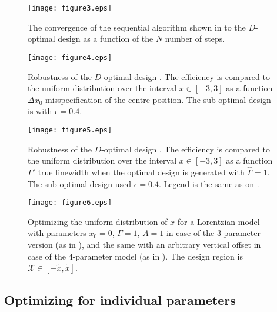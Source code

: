 \documentclass[12pt]{iopart}
\begin{document}
\begin{figure}
\texttt{[image: figure3.eps]}
\caption{The convergence of the sequential algorithm shown in  to the $D$-optimal design  as a function of the $N$ number of steps.}
\label{fig:xinefficiency}
\end{figure}

\begin{figure}
\texttt{[image: figure4.eps]}
\caption{Robustness of the $D$-optimal design . The efficiency is compared to the uniform distribution over the interval $x\in [-3,3]$ as a function $\Delta x_0$ misspecification of the centre position. The sub-optimal design is  with $\epsilon = 0.4$.}
\label{fig:x0robust}
\end{figure}

\begin{figure}
\texttt{[image: figure5.eps]}
\caption{Robustness of the $D$-optimal design . The efficiency is compared to the uniform distribution over the interval $x\in [-3,3]$ as a function $\Gamma'$ true linewidth when the optimal design is generated with $\hat \Gamma = 1$. The sub-optimal design used $\epsilon = 0.4$. Legend is the same as on .}
\label{fig:grobust}
\end{figure}

\begin{figure}
\texttt{[image: figure6.eps]}
\caption{Optimizing the uniform distribution of $x$ for a Lorentzian model with parameters $x_0=0$, $\Gamma = 1$, $A = 1$ in case of the 3-parameter version (as in ), and the same with an arbitrary vertical offset in case of the 4-parameter model (as in ). The design region is $\mathcal{X} \in [-\tilde x, \tilde x]$.}
\label{fig:optimaluniform}
\end{figure}


\subsection{Optimizing for individual parameters}
\label{seq:exopts}
\end{document}
